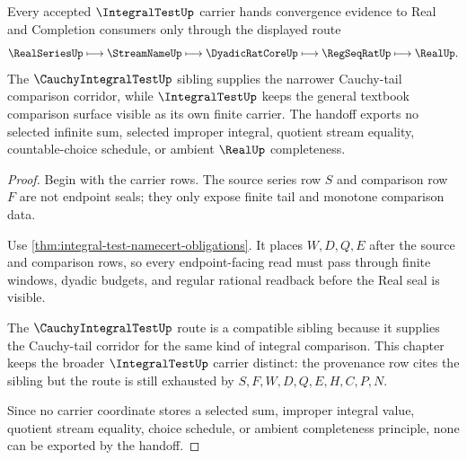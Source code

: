 \begin{theorem}
\label{thm:integral-test-cauchy-series-handoff}
Every accepted $\IntegralTestUp$ carrier hands convergence evidence to Real and Completion consumers only through the displayed route
$$
\RealSeriesUp \longmapsto \StreamNameUp \longmapsto \DyadicRatCoreUp \longmapsto \RegSeqRatUp \longmapsto \RealUp .
$$
The $\CauchyIntegralTestUp$ sibling supplies the narrower Cauchy-tail comparison corridor, while $\IntegralTestUp$ keeps the general textbook comparison surface visible as its own finite carrier. The handoff exports no selected infinite sum, selected improper integral, quotient stream equality, countable-choice schedule, or ambient $\RealUp$ completeness.
\end{theorem}
\begin{proof}
Begin with the carrier rows. The source series row $S$ and comparison row $F$ are not endpoint seals; they only expose finite tail and monotone comparison data.

Use \autoref{thm:integral-test-namecert-obligations}. It places $W,D,Q,E$ after the source and comparison rows, so every endpoint-facing read must pass through finite windows, dyadic budgets, and regular rational readback before the Real seal is visible.

The $\CauchyIntegralTestUp$ route is a compatible sibling because it supplies the Cauchy-tail corridor for the same kind of integral comparison. This chapter keeps the broader $\IntegralTestUp$ carrier distinct: the provenance row cites the sibling but the route is still exhausted by $S,F,W,D,Q,E,H,C,P,N$.

Since no carrier coordinate stores a selected sum, improper integral value, quotient stream equality, choice schedule, or ambient completeness principle, none can be exported by the handoff.
\end{proof}



